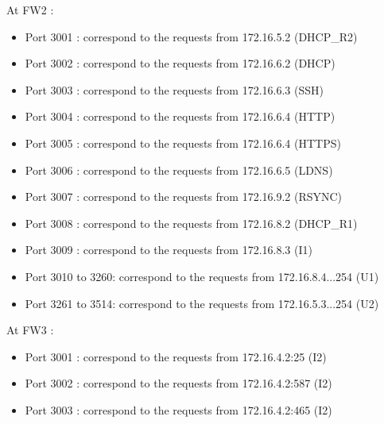 \documentclass[a4paper,titlepage]{article}
\begin{document}
At FW2 :
\begin{itemize}
	\item Port 3001 : correspond to the requests from 172.16.5.2 (DHCP\_R2)
	\item Port 3002 : correspond to the requests from 172.16.6.2 (DHCP)
	\item Port 3003 : correspond to the requests from 172.16.6.3 (SSH)
	\item Port 3004 : correspond to the requests from 172.16.6.4 (HTTP)
	\item Port 3005 : correspond to the requests from 172.16.6.4 (HTTPS)
	\item Port 3006 : correspond to the requests from 172.16.6.5 (LDNS)
	\item Port 3007 : correspond to the requests from 172.16.9.2 (RSYNC)
	\item Port 3008 : correspond to the requests from 172.16.8.2 (DHCP\_R1)
	\item Port 3009 : correspond to the requests from 172.16.8.3 (I1)
	\item Port 3010 to 3260: correspond to the requests from 172.16.8.4...254 (U1)
	\item Port 3261 to 3514: correspond to the requests from 172.16.5.3...254 (U2)

\end{itemize}



At FW3 :
\begin{itemize}
	\item Port 3001 : correspond to the requests from 172.16.4.2:25 (I2)
	\item Port 3002 : correspond to the requests from 172.16.4.2:587 (I2)
	\item Port 3003 : correspond to the requests from 172.16.4.2:465 (I2)
\end{itemize}
\end{document}
